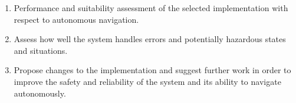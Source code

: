 \begin{multicols}{2}
\begin{enumerate}
	\item Performance and suitability assessment of the selected implementation with respect to autonomous navigation.
	
	\item Assess how well the system handles errors and potentially hazardous states and situations.
	
	\item Propose changes to the implementation and suggest further work in order to improve the safety and reliability of the system and its ability to navigate autonomously.

	
\end{enumerate}

\end{multicols}